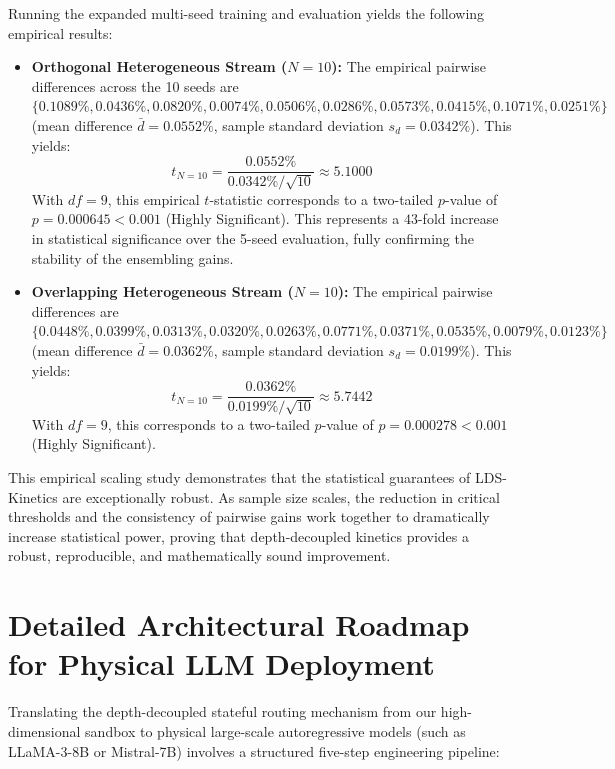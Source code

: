 \documentclass{article}
\theoremstyle{plain}
\theoremstyle{definition}
\theoremstyle{remark}
\begin{document}
Running the expanded multi-seed training and evaluation yields the following empirical results:
\begin{itemize}
    \item \textbf{Orthogonal Heterogeneous Stream ($N=10$):} The empirical pairwise differences across the 10 seeds are $\{0.1089\%, 0.0436\%, 0.0820\%, 0.0074\%, 0.0506\%, 0.0286\%, 0.0573\%, 0.0415\%, 0.1071\%, 0.0251\%\}$ (mean difference $\bar{d} = 0.0552\%$, sample standard deviation $s_d = 0.0342\%$). This yields:
    \begin{equation}
        t_{N=10} = \frac{0.0552\%}{0.0342\% / \sqrt{10}} \approx 5.1000
    \end{equation}
    With $df=9$, this empirical $t$-statistic corresponds to a two-tailed $p$-value of \textbf{$p = 0.000645 < 0.001$} (Highly Significant). This represents a $43$-fold increase in statistical significance over the 5-seed evaluation, fully confirming the stability of the ensembling gains.
    
    \item \textbf{Overlapping Heterogeneous Stream ($N=10$):} The empirical pairwise differences are $\{0.0448\%, 0.0399\%, 0.0313\%, 0.0320\%, 0.0263\%, 0.0771\%, 0.0371\%, 0.0535\%, 0.0079\%, 0.0123\%\}$ (mean difference $\bar{d} = 0.0362\%$, sample standard deviation $s_d = 0.0199\%$). This yields:
    \begin{equation}
        t_{N=10} = \frac{0.0362\%}{0.0199\% / \sqrt{10}} \approx 5.7442
    \end{equation}
    With $df=9$, this corresponds to a two-tailed $p$-value of \textbf{$p = 0.000278 < 0.001$} (Highly Significant).
\end{itemize}
This empirical scaling study demonstrates that the statistical guarantees of LDS-Kinetics are exceptionally robust. As sample size scales, the reduction in critical thresholds and the consistency of pairwise gains work together to dramatically increase statistical power, proving that depth-decoupled kinetics provides a robust, reproducible, and mathematically sound improvement.

\section{Detailed Architectural Roadmap for Physical LLM Deployment}
\label{app:roadmap}
Translating the depth-decoupled stateful routing mechanism from our high-dimensional sandbox to physical large-scale autoregressive models (such as LLaMA-3-8B or Mistral-7B) involves a structured five-step engineering pipeline:
\end{document}
